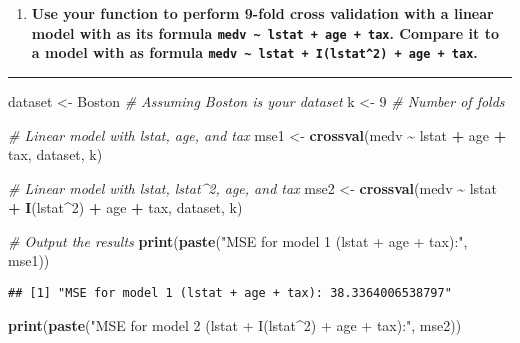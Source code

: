 \documentclass[
  12pt,
]{article}
\newenvironment{Shaded}{\begin{snugshade}}{\end{snugshade}}
\newcommand{\CommentTok}[1]{\textcolor[rgb]{0.56,0.35,0.01}{\textit{#1}}}
\newcommand{\DecValTok}[1]{\textcolor[rgb]{0.00,0.00,0.81}{#1}}
\newcommand{\FunctionTok}[1]{\textcolor[rgb]{0.13,0.29,0.53}{\textbf{#1}}}
\newcommand{\NormalTok}[1]{#1}
\newcommand{\OtherTok}[1]{\textcolor[rgb]{0.56,0.35,0.01}{#1}}
\newcommand{\SpecialCharTok}[1]{\textcolor[rgb]{0.81,0.36,0.00}{\textbf{#1}}}
\newcommand{\StringTok}[1]{\textcolor[rgb]{0.31,0.60,0.02}{#1}}
\providecommand{\tightlist}{%
  \setlength{\itemsep}{0pt}\setlength{\parskip}{0pt}}
\begin{document}
\begin{enumerate}
\def\labelenumi{\arabic{enumi}.}
\setcounter{enumi}{18}
\tightlist
\item
  \textbf{Use your function to perform 9-fold cross validation with a
  linear model with as its formula
  \texttt{medv\ \textasciitilde{}\ lstat\ +\ age\ +\ tax}. Compare it to
  a model with as formula
  \texttt{medv\ \textasciitilde{}\ lstat\ +\ I(lstat\^{}2)\ +\ age\ +\ tax}.}
\end{enumerate}

\begin{center}\rule{0.5\linewidth}{0.5pt}\end{center}

\begin{Shaded}
\begin{Highlighting}[]
\NormalTok{dataset }\OtherTok{\textless{}{-}}\NormalTok{ Boston  }\CommentTok{\# Assuming \textquotesingle{}Boston\textquotesingle{} is your dataset}
\NormalTok{k }\OtherTok{\textless{}{-}} \DecValTok{9}  \CommentTok{\# Number of folds}

\CommentTok{\# Linear model with lstat, age, and tax}
\NormalTok{mse1 }\OtherTok{\textless{}{-}} \FunctionTok{crossval}\NormalTok{(medv }\SpecialCharTok{\textasciitilde{}}\NormalTok{ lstat }\SpecialCharTok{+}\NormalTok{ age }\SpecialCharTok{+}\NormalTok{ tax, dataset, k)}

\CommentTok{\# Linear model with lstat, lstat\^{}2, age, and tax}
\NormalTok{mse2 }\OtherTok{\textless{}{-}} \FunctionTok{crossval}\NormalTok{(medv }\SpecialCharTok{\textasciitilde{}}\NormalTok{ lstat }\SpecialCharTok{+} \FunctionTok{I}\NormalTok{(lstat}\SpecialCharTok{\^{}}\DecValTok{2}\NormalTok{) }\SpecialCharTok{+}\NormalTok{ age }\SpecialCharTok{+}\NormalTok{ tax, dataset, k)}

\CommentTok{\# Output the results}
\FunctionTok{print}\NormalTok{(}\FunctionTok{paste}\NormalTok{(}\StringTok{"MSE for model 1 (lstat + age + tax):"}\NormalTok{, mse1))}
\end{Highlighting}
\end{Shaded}

\begin{verbatim}
## [1] "MSE for model 1 (lstat + age + tax): 38.3364006538797"
\end{verbatim}

\begin{Shaded}
\begin{Highlighting}[]
\FunctionTok{print}\NormalTok{(}\FunctionTok{paste}\NormalTok{(}\StringTok{"MSE for model 2 (lstat + I(lstat\^{}2) + age + tax):"}\NormalTok{, mse2))}
\end{Highlighting}
\end{Shaded}
\end{document}
